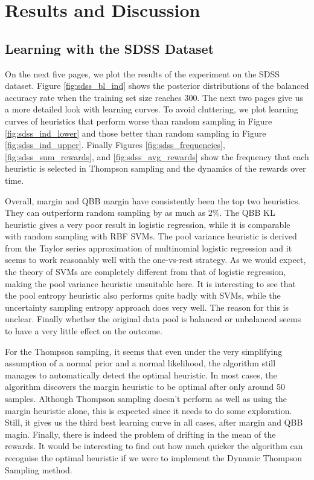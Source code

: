 \section{Results and Discussion}
\label{sec:results2}
\subsection{Learning with the SDSS Dataset}

On the next five pages, we plot the results of the experiment on the SDSS dataset.
Figure \ref{fig:sdss_bl_ind} shows the posterior distributions of the
balanced accuracy rate when the training set size reaches 300. The next two pages give us
a more detailed look with learning curves. To avoid cluttering, we plot learning curves
of heuristics that perform worse than random sampling in Figure \ref{fig:sdss_ind_lower}
and those better than random sampling in Figure \ref{fig:sdss_ind_upper}. Finally
Figures \ref{fig:sdss_frequencies}, \ref{fig:sdss_sum_rewards}, and
\ref{fig:sdss_avg_rewards} show the frequency that each heuristic is selected in Thompson
sampling and the dynamics of the rewards over time.

Overall, margin and QBB margin have consistently been the top two heuristics. They can
outperform random sampling by as much as 2\%. The QBB KL heuristic gives a very poor result
in logistic regression, while it is comparable with random sampling with RBF SVMs.
The pool variance heuristic is derived from the Taylor series approximation
of multinomial logistic regression and it seems to work reasonably well with the one-vs-rest
strategy. As we would expect, the theory of SVMs are completely different from that of logistic
regression, making the pool variance heuristic unsuitable here. It is interesting
to see that the pool entropy heuristic also performs quite badly with SVMs, while
the uncertainty sampling entropy approach does very well. The reason for this is unclear.
Finally whether the original data pool is balanced or unbalanced seems to have a very little effect
on the outcome.

For the Thompson sampling, it seems that even under the very simplifying assumption 
of a normal prior and a normal likelihood, the algorithm still manages to automatically detect
the optimal heuristic. In most cases, the algorithm discovers the margin heuristic to
be optimal after only around 50 samples. Although Thompson sampling doesn't perform as well
as using the margin heuristic alone, this is expected since it needs to do some exploration.
Still, it gives us the third best learning curve in all cases, after margin and QBB magin.
Finally, there is indeed the problem of drifting in the mean of the rewards. It would be
interesting to find out how much quicker the algorithm can recognise the optimal heuristic
if we were to implement the Dynamic Thompson Sampling method.


